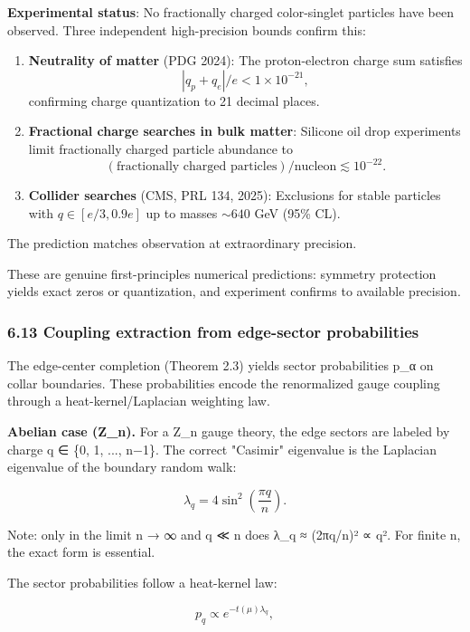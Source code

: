 \textbf{Experimental status}: No fractionally charged color-singlet particles have been observed. Three independent high-precision bounds confirm this:

\begin{enumerate}
\def\labelenumi{\arabic{enumi}.}
\item
  \textbf{Neutrality of matter} (PDG 2024): The proton-electron charge sum satisfies \[|q_p + q_e|/e < 1 \times 10^{-21},\] confirming charge quantization to 21 decimal places.
\item
  \textbf{Fractional charge searches in bulk matter}: Silicone oil drop experiments limit fractionally charged particle abundance to \[(\text{fractionally charged particles})/\text{nucleon} \lesssim 10^{-22}.\]
\item
  \textbf{Collider searches} (CMS, PRL 134, 2025): Exclusions for stable particles with \(q \in [e/3, 0.9e]\) up to masses \(\sim 640\) GeV (95\% CL).
\end{enumerate}

The prediction matches observation at extraordinary precision.

These are genuine first-principles numerical predictions: symmetry protection yields exact zeros or quantization, and experiment confirms to available precision.

\subsubsection{6.13 Coupling extraction from edge-sector probabilities}\label{613-coupling-extraction-from-edge-sector-probabilities}

The edge-center completion (Theorem 2.3) yields sector probabilities p\_α on collar boundaries. These probabilities encode the renormalized gauge coupling through a heat-kernel/Laplacian weighting law.

\textbf{Abelian case (Z\_n).} For a Z\_n gauge theory, the edge sectors are labeled by charge q ∈ \{0, 1, ..., n−1\}. The correct "Casimir" eigenvalue is the Laplacian eigenvalue of the boundary random walk:

\[
\lambda_q = 4 \sin^2\left(\frac{\pi q}{n}\right).
\]

Note: only in the limit n → ∞ and q ≪ n does λ\_q ≈ (2πq/n)² ∝ q². For finite n, the exact form is essential.

The sector probabilities follow a heat-kernel law:

\[
p_q \propto e^{-t(\mu) \lambda_q},
\]


